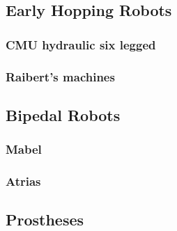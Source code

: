 \subsection{Early Hopping Robots}
\subsubsection{CMU hydraulic six legged}
\subsubsection{Raibert's machines}

\subsection{Bipedal Robots}
\subsubsection{Mabel}
\subsubsection{Atrias}

\subsection{Prostheses}
